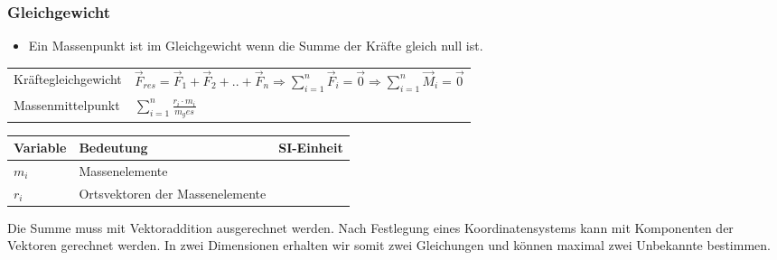 \documentclass[
a4paper,
oneside,
landscape, 
8pt,
]{scrartcl}
\begin{document}
\begin{multicols*}{2}
\begin{minipage}[h!]{0.5\linewidth}
\end{minipage}


\vfill\null
\columnbreak



\subsubsection{Gleichgewicht}
\begin{itemize}
	\item Ein Massenpunkt ist im Gleichgewicht wenn die Summe der Kräfte gleich null ist. 
\end{itemize}

\begin{tabbing}
	\begin{tabu} to \linewidth {l X}
		\toprule
		Kräftegleichgewicht & 
		$\vec{F}_{res} = \vec{F}_1 +\vec{F}_2 + .. + \vec{F}_n \Rightarrow  \sum_{i=1}^{n}\vec{F}_i = \vec{0}
		\Rightarrow  \sum_{i=1}^{n}\vec{M}_i = \vec{0}$ \\
		Massenmittelpunkt & $\sum_{i=1}^{n} \frac{r_i \cdot m_i}{m_ges}$ \\
		\bottomrule
	\end{tabu}
\end{tabbing}

\begin{tabbing}
	\begin{tabu} to \linewidth {l X l}
		Variable & Bedeutung & SI-Einheit \\
		\midrule
		$m_i$ & Massenelemente &  \\ 
		$r_i$ & Ortsvektoren der Massenelemente &  \\ 
		\bottomrule
	\end{tabu}
\end{tabbing}

Die Summe muss mit Vektoraddition ausgerechnet werden. Nach Festlegung eines Koordinatensystems kann mit Komponenten der Vektoren gerechnet werden. In zwei Dimensionen erhalten wir somit zwei Gleichungen und können maximal zwei Unbekannte bestimmen.



\end{multicols*}
\end{document}
